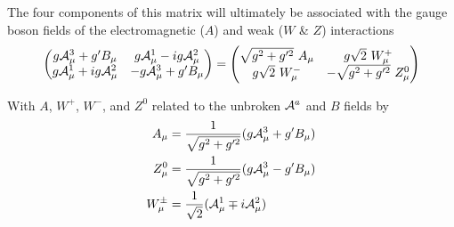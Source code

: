     The four components of this matrix will ultimately be associated with the 
        gauge boson fields of the electromagnetic ($A$) and weak ($W$ \& $Z$) interactions
    \begin{equation} \begin{split}
        \label{eq:electroweak_matrix}
        \begin{pmatrix} 
            g\wField^3_{\mu} + g'B_{\mu} & g\wField^1_{\mu} - ig\wField^2_{\mu} \\
            g\wField^1_{\mu} + ig\wField^2_{\mu} & -g\wField^3_{\mu} + g'B_{\mu}
        \end{pmatrix} =
        \begin{pmatrix} 
            \sqrt{g^2 + g^{\prime 2}}\ A_{\mu} & g \sqrt{2}\ W^+_{\mu} \\
            g \sqrt{2}\ W^-_{\mu} & - \sqrt{g^2 + g^{\prime 2}}\ Z^0_{\mu}
        \end{pmatrix}
    \end{split} \end{equation}

    With $A$, $W^+$, $W^-$, and $Z^0$ related to the unbroken $\mathcal{A}^a$ and $B$ fields by
    \begin{equation} \begin{split}
        A_{\mu} & = \frac{1}{\sqrt{g^2 + g^{\prime 2}}} ( g\mathcal{A}^3_{\mu} + g'B_{\mu} ) \\
        Z^0_{\mu} & = \frac{1}{\sqrt{g^2 + g^{\prime 2}}} ( g\mathcal{A}^3_{\mu} - g'B_{\mu} ) \\
        W^{\pm}_{\mu} & = \frac{1}{\sqrt{2}} (\mathcal{A}^1_{\mu} \mp i\mathcal{A}^2_{\mu})
    \end{split} \end{equation}

